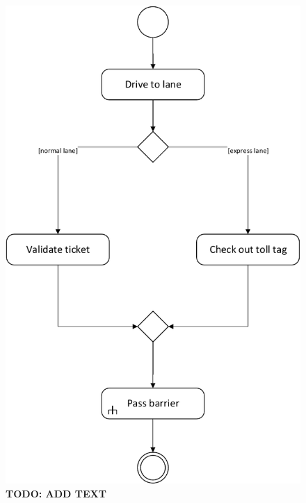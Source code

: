 \begin{figure}
\centerline{\includegraphics[width=\textwidth]{img/activity_diagrams/Check_Out}}
\caption{\textbf{TODO: ADD TEXT}}
\label{fig:activity_co}
\end{figure}

